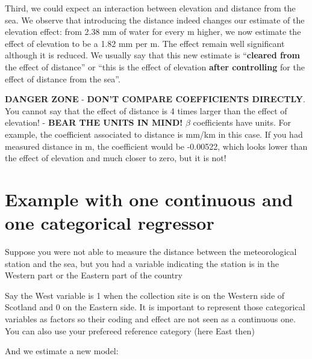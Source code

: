 \documentclass[
  letterpaper,
  DIV=11,
  numbers=noendperiod]{scrreprt}
\newenvironment{Shaded}{\begin{snugshade}}{\end{snugshade}}
\newcommand{\DecValTok}[1]{\textcolor[rgb]{0.68,0.00,0.00}{#1}}
\newcommand{\FunctionTok}[1]{\textcolor[rgb]{0.28,0.35,0.67}{#1}}
\newcommand{\NormalTok}[1]{\textcolor[rgb]{0.00,0.23,0.31}{#1}}
\newcommand{\OtherTok}[1]{\textcolor[rgb]{0.00,0.23,0.31}{#1}}
\newcommand{\SpecialCharTok}[1]{\textcolor[rgb]{0.37,0.37,0.37}{#1}}
\begin{document}
Third, we could expect an interaction between elevation and distance
from the sea. We observe that introducing the distance indeed changes
our estimate of the elevation effect: from 2.38 mm of water for every m
higher, we now estimate the effect of elevation to be a 1.82 mm per m.
The effect remain well significant although it is reduced. We usually
say that this new estimate is ``\textbf{cleared from} the effect of
distance'' or ``this is the effect of elevation \textbf{after
controlling} for the effect of distance from the sea''.

\textbf{DANGER ZONE} - \textbf{DON'T COMPARE COEFFICIENTS DIRECTLY}. You
cannot say that the effect of distance is 4 times larger than the effect
of elevation! - \textbf{BEAR THE UNITS IN MIND!} \(\beta\) coefficients
have units. For example, the coefficient associated to distance is mm/km
in this case. If you had measured distance in m, the coefficient would
be -0.00522, which looks lower than the effect of elevation and much
closer to zero, but it is not!

\section{Example with one continuous and one categorical
regressor}\label{example-with-one-continuous-and-one-categorical-regressor}

Suppose you were not able to measure the distance between the
meteorological station and the sea, but you had a variable indicating
the station is in the Western part or the Eastern part of the country

Say the West variable is 1 when the collection site is on the Western
side of Scotland and 0 on the Eastern side. It is important to represent
those categorical variables as factors so their coding and effect are
not seen as a continuous one. You can also use your prefereed reference
category (here East then)

\begin{Shaded}
\end{Shaded}

And we estimate a new model:
\end{document}
